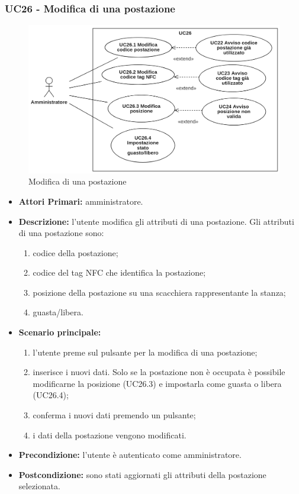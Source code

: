 \subsubsection{ UC26 - Modifica di una postazione}
\begin{figure}[H]
	\centering
	\includegraphics[width=15cm]{res/images/UC26.png}
	\caption{Modifica di una postazione}
\end{figure}
\begin{itemize}
	\item\textbf{Attori Primari:}
	amministratore.
	\item\textbf{Descrizione:}
	l'utente modifica gli attributi di una postazione.
	Gli attributi di una postazione sono:
	\begin{enumerate}
		\item codice della postazione;
		\item codice del tag NFC che identifica la postazione;
		\item posizione della postazione su una scacchiera rappresentante la stanza;
		\item guasta/libera.
	\end{enumerate}
	\item\textbf{Scenario principale:} 
	\begin{enumerate}
		\item l'utente preme sul pulsante per la modifica di una postazione;
		\item inserisce i nuovi dati. Solo se la postazione non è occupata è possibile modificarne la posizione (UC26.3) e impostarla come guasta o libera (UC26.4);
		\item conferma i nuovi dati premendo un pulsante;
		\item i dati della postazione vengono modificati.
	\end{enumerate}
	\item\textbf{Precondizione:} 
	l'utente è autenticato come amministratore.
	\item\textbf{Postcondizione:}
	sono stati aggiornati gli attributi della postazione selezionata.
\end{itemize}

